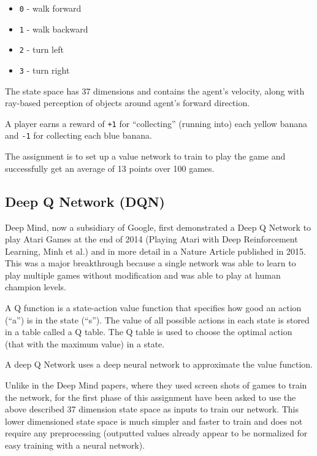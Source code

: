 \documentclass[11pt]{article}
\providecommand{\tightlist}{%
      \setlength{\itemsep}{0pt}\setlength{\parskip}{0pt}}
\begin{document}
\begin{itemize}
\tightlist
\item
  \texttt{0} - walk forward
\item
  \texttt{1} - walk backward
\item
  \texttt{2} - turn left
\item
  \texttt{3} - turn right
\end{itemize}

The state space has 37 dimensions and contains the agent's velocity,
along with ray-based perception of objects around agent's forward
direction.

A player earns a reward of \texttt{+1} for ``collecting'' (running into)
each yellow banana and \texttt{-1} for collecting each blue banana.

The assignment is to set up a value network to train to play the game
and successfully get an average of 13 points over 100 games.

\hypertarget{deep-q-network-dqn}{%
\subsection{Deep Q Network (DQN)}\label{deep-q-network-dqn}}

Deep Mind, now a subsidiary of Google, first demonstrated a Deep Q
Network to play Atari Games at the end of 2014 (Playing Atari with Deep
Reinforcement Learning, Minh et al.) and in more detail in a Nature
Article published in 2015. This was a major breakthrough because a
single network was able to learn to play multiple games without
modification and was able to play at human champion levels.

A Q function is a state-action value function that specifies how good an
action (``a'') is in the state (``s''). The value of all possible
actions in each state is stored in a table called a Q table. The Q table
is used to choose the optimal action (that with the maximum value) in a
state.

A deep Q Network uses a deep neural network to approximate the value
function.

Unlike in the Deep Mind papers, where they used screen shots of games to
train the network, for the first phase of this assignment have been
asked to use the above described 37 dimension state space as inputs to
train our network. This lower dimensioned state space is much simpler
and faster to train and does not require any preprocessing (outputted
values already appear to be normalized for easy training with a neural
network).
\end{document}
